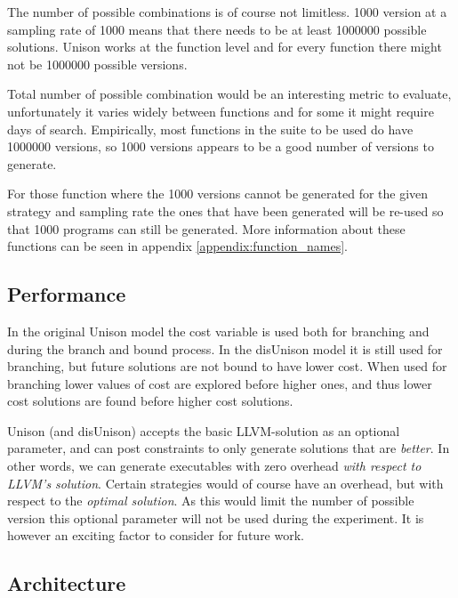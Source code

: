 The number of possible combinations is of course not limitless. 1000 version at a sampling
rate of 1000 means that there needs to be at least 1000000 possible solutions. Unison works
at the function level and for every function there might not be 1000000 possible versions.

Total number of possible combination would be an interesting metric to evaluate, unfortunately
it varies widely between functions and for some it might require days of search. Empirically,
most functions in the suite to be used do have 1000000 versions, so 1000 versions appears
to be a good number of versions to generate.

For those function where the 1000 versions cannot be generated for the given strategy and
sampling rate the ones that have been generated will be re-used so that 1000 programs can
still be generated. More information about these functions can be seen in appendix
\ref{appendix:function_names}.

\subsection{Performance}
\label{sec:performance}

In the original Unison model the cost variable is used both for branching and during the
branch and bound process. In the disUnison model it is still used for branching, but future
solutions are not bound to have lower cost. When used for branching lower values of cost
are explored before higher ones, and thus lower cost solutions are found before higher
cost solutions.

Unison (and disUnison) accepts the basic LLVM-solution as an optional parameter, and can
post constraints to only generate solutions that are \textit{better}. In other words, we
can generate executables with zero overhead \textit{with respect to LLVM's solution}.
Certain strategies would of course have an overhead, but with respect to the
\textit{optimal solution}. As this would limit the number of possible version this
optional parameter will not be used during the experiment. It is however an exciting
factor to consider for future work.

\subsection{Architecture}
\label{sec:arch}

